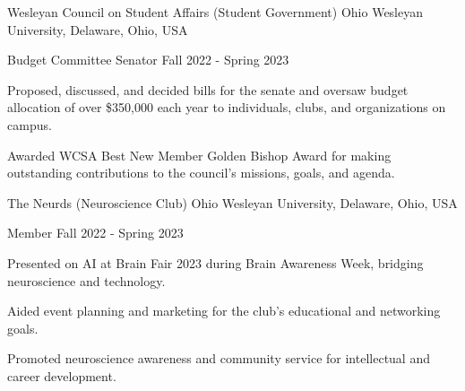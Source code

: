 \documentclass[10pt, letterpaper]{article}
\begin{document}
\begin{leadershipentry}
    {Wesleyan Council on Student Affairs (Student Government)} %
    {Ohio Wesleyan University, Delaware, Ohio, USA} %
    \begin{positionentry}
        {Budget Committee Senator} %
        {Fall 2022 - Spring 2023} %
        \item Proposed, discussed, and decided bills for the senate and oversaw budget allocation of over \$350,000 each year to individuals, clubs, and organizations on campus.
        \item Awarded WCSA Best New Member Golden Bishop Award for making outstanding contributions to the council's missions, goals, and agenda.
    \end{positionentry}
\end{leadershipentry}

\begin{leadershipentry}
    {The Neurds (Neuroscience Club)} %
    {Ohio Wesleyan University, Delaware, Ohio, USA} %
    \begin{positionentry}
        {Member} %
        {Fall 2022 - Spring 2023} %
        \item Presented on AI at Brain Fair 2023 during Brain Awareness Week, bridging neuroscience and technology.
        \item Aided event planning and marketing for the club's educational and networking goals.
        \item Promoted neuroscience awareness and community service for intellectual and career development.
    \end{positionentry}
\end{leadershipentry}
\end{document}
